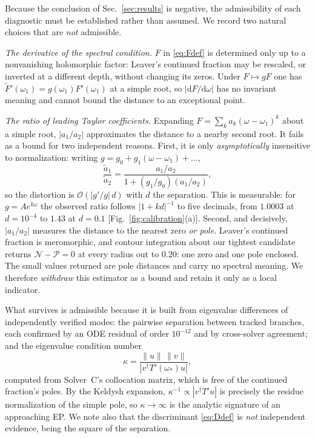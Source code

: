 \documentclass[aps,prd,reprint,superscriptaddress,nofootinbib,longbibliography]{revtex4-2}
\theoremstyle{plain}
\theoremstyle{definition}
\theoremstyle{remark}
\newcommand{\dd}{\mathrm{d}}
\newcommand{\Ord}{\mathcal{O}}
\begin{document}
Because the conclusion of Sec.~\ref{sec:results} is negative, the admissibility
of each diagnostic must be established rather than assumed. We record two
natural choices that are \emph{not} admissible.

\emph{The derivative of the spectral condition.} $F$ in \eqref{eq:Fdef} is
determined only up to a nonvanishing holomorphic factor: Leaver's continued
fraction may be rescaled, or inverted at a different depth, without changing its
zeros. Under $F\mapsto gF$ one has $\tilde F'(\omega_1)=g(\omega_1)F'(\omega_1)$
at a simple root, so $|\dd F/\dd\omega|$ has no invariant meaning and cannot
bound the distance to an exceptional point.

\emph{The ratio of leading Taylor coefficients.} Expanding
$F=\sum_ka_k(\omega-\omega_1)^k$ about a simple root, $|a_1/a_2|$ approximates
the distance to a nearby second root. It fails as a bound for two independent
reasons. First, it is only \emph{asymptotically} insensitive to normalization:
writing $g=g_0+g_1(\omega-\omega_1)+\dots$,
\begin{equation}\label{eq:a1a2distortion}
  \frac{\tilde a_1}{\tilde a_2}
  = \frac{a_1/a_2}{1+(g_1/g_0)(a_1/a_2)},
\end{equation}
so the distortion is $\Ord(|g'/g|\,d)$ with $d$ the separation. This is
measurable: for $g=Ae^{k\omega}$ the observed ratio follows $|1+kd|^{-1}$ to five
decimals, from $1.0003$ at $d=10^{-4}$ to $1.43$ at $d=0.1$
[Fig.~\ref{fig:calibration}(a)]. Second, and decisively, $|a_1/a_2|$ measures the
distance to the nearest zero \emph{or pole}. Leaver's continued fraction is
meromorphic, and contour integration about our tightest candidate returns
$\mathcal{N}-\mathcal{P}=0$ at every radius out to $0.20$: one zero and one pole
enclosed. The small values returned are pole distances and carry no spectral
meaning. We therefore \emph{withdraw} this estimator as a bound and retain it
only as a local indicator.

What survives is admissible because it is built from eigenvalue differences of
independently verified modes: the pairwise separation between tracked branches,
each confirmed by an ODE residual of order $10^{-12}$ and by cross-solver
agreement; and the eigenvalue condition number
\begin{equation}\label{eq:kappa}
  \kappa=\frac{\|u\|\,\|v\|}{|v^\dagger T'(\omega_*)u|},
\end{equation}
computed from Solver~C's collocation matrix, which is free of the continued
fraction's poles. By the Keldysh expansion, $\kappa^{-1}\propto|v^\dagger T'u|$
is precisely the residue normalization of the simple pole, so $\kappa\to\infty$
is the analytic signature of an approaching EP. We note also that the
discriminant \eqref{eq:Ddef} is \emph{not} independent evidence, being the
square of the separation.
\end{document}
